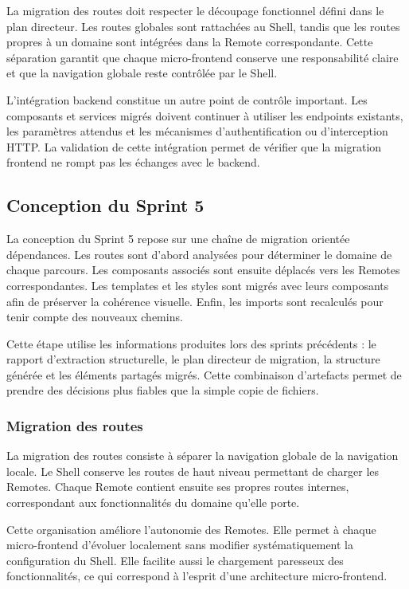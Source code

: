 La migration des routes doit respecter le découpage fonctionnel défini dans le plan directeur. Les routes globales sont rattachées au Shell, tandis que les routes propres à un domaine sont intégrées dans la Remote correspondante. Cette séparation garantit que chaque micro-frontend conserve une responsabilité claire et que la navigation globale reste contrôlée par le Shell.

L'intégration backend constitue un autre point de contrôle important. Les composants et services migrés doivent continuer à utiliser les endpoints existants, les paramètres attendus et les mécanismes d'authentification ou d'interception HTTP. La validation de cette intégration permet de vérifier que la migration frontend ne rompt pas les échanges avec le backend.

\subsection{Conception du Sprint 5}

La conception du Sprint 5 repose sur une chaîne de migration orientée dépendances. Les routes sont d'abord analysées pour déterminer le domaine de chaque parcours. Les composants associés sont ensuite déplacés vers les Remotes correspondantes. Les templates et les styles sont migrés avec leurs composants afin de préserver la cohérence visuelle. Enfin, les imports sont recalculés pour tenir compte des nouveaux chemins.

Cette étape utilise les informations produites lors des sprints précédents : le rapport d'extraction structurelle, le plan directeur de migration, la structure générée et les éléments partagés migrés. Cette combinaison d'artefacts permet de prendre des décisions plus fiables que la simple copie de fichiers.

\subsubsection{Migration des routes}

La migration des routes consiste à séparer la navigation globale de la navigation locale. Le Shell conserve les routes de haut niveau permettant de charger les Remotes. Chaque Remote contient ensuite ses propres routes internes, correspondant aux fonctionnalités du domaine qu'elle porte.

Cette organisation améliore l'autonomie des Remotes. Elle permet à chaque micro-frontend d'évoluer localement sans modifier systématiquement la configuration du Shell. Elle facilite aussi le chargement paresseux des fonctionnalités, ce qui correspond à l'esprit d'une architecture micro-frontend.

